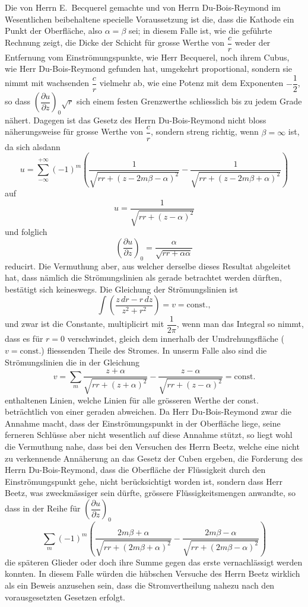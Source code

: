 \documentclass[12pt,a4paper]{book}
\theoremstyle{definition}
\theoremstyle{remark}
\begin{document}
Die von Herrn E.~Becquerel gemachte und von Herrn Du-Bois-Reymond im Wesentlichen beibehaltene specielle Voraussetzung ist die, dass die Kathode ein Punkt der Oberfläche, also $\alpha = \beta$ sei; in diesem Falle ist, wie die geführte Rechnung zeigt, die Dicke der Schicht für grosse Werthe von $\dfrac{c}{r}$ weder der Entfernung vom Einströmungspunkte, wie Herr Becquerel, noch ihrem Cubus, wie Herr Du-Bois-Reymond gefunden hat, umgekehrt proportional, sondern sie nimmt mit wachsenden $\dfrac{c}{r}$ vielmehr ab, wie eine Potenz mit dem Exponenten $-\dfrac{1}{2}$, so dass $\left(\dfrac{\partial u}{\partial z}\right)_0 \sqrt{r}$ sich einem festen Grenzwerthe schliesslich bis zu jedem Grade nähert. Dagegen ist das Gesetz des Herrn Du-Bois-Reymond nicht bloss näherungsweise für grosse Werthe von $\dfrac{c}{r}$, sondern streng richtig, wenn $\beta = \infty$ ist, da sich alsdann
\[
u = \sum_{-\infty}^{+\infty} (-1)^m \left( \frac{1}{\sqrt{rr + (z - 2m\beta - \alpha)^2}} - \frac{1}{\sqrt{rr + (z - 2m\beta + \alpha)^2}} \right)
\]
auf
\[
u = \frac{1}{\sqrt{rr + (z - \alpha)^2}}
\]
und folglich
\[
\left(\frac{\partial u}{\partial z}\right)_0 = \frac{\alpha}{\sqrt{rr + \alpha\alpha}}
\]
reducirt. Die Vermuthung aber, aus welcher derselbe dieses Resultat abgeleitet hat, dass nämlich die Strömungslinien als gerade betrachtet werden dürften, bestätigt sich keineswegs. Die Gleichung der Strömungslinien ist
\[
\int \left(\frac{z\,dr - r\,dz}{z^2 + r^2}\right) = v = \text{const.},
\]
und zwar ist die Constante, multiplicirt mit $\dfrac{1}{2\pi}$, wenn man das Integral so nimmt, dass es für $r = 0$ verschwindet, gleich dem innerhalb der Umdrehungsfläche ($v = \text{const.}$) fliessenden Theile des Stromes. In unserm Falle also sind die Strömungslinien die in der Gleichung
\[
v = \sum_m \frac{z + \alpha}{\sqrt{rr + (z + \alpha)^2}} - \frac{z - \alpha}{\sqrt{rr + (z - \alpha)^2}} = \text{const.}
\]
enthaltenen Linien, welche Linien für alle grösseren Werthe der const. beträchtlich von einer geraden abweichen. Da Herr Du-Bois-Reymond zwar die Annahme macht, dass der Einströmungspunkt in der Oberfläche liege, seine ferneren Schlüsse aber nicht wesentlich auf diese Annahme stützt, so liegt wohl die Vermuthung nahe, dass bei den Versuchen des Herrn Beetz, welche eine nicht zu verkennende Annäherung an das Gesetz der Cuben ergeben, die Forderung des Herrn Du-Bois-Reymond, dass die Oberfläche der Flüssigkeit durch den Einströmungspunkt gehe, nicht berücksichtigt worden ist, sondern dass Herr Beetz, was zweckmässiger sein dürfte, grössere Flüssigkeitsmengen anwandte, so dass in der Reihe für $\left(\dfrac{\partial u}{\partial z}\right)_0$
\[
\sum_m (-1)^m \left( \frac{2m\beta + \alpha}{\sqrt{rr + (2m\beta + \alpha)^2}} - \frac{2m\beta - \alpha}{\sqrt{rr + (2m\beta - \alpha)^2}} \right)
\]
die späteren Glieder oder doch ihre Summe gegen das erste vernachlässigt werden konnten. In diesem Falle würden die hübschen Versuche des Herrn Beetz wirklich als ein Beweis anzusehen sein, dass die Stromvertheilung nahezu nach den vorausgesetzten Gesetzen erfolgt.
\end{document}
